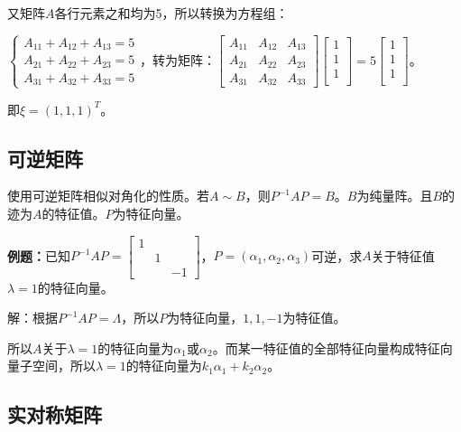 \documentclass[UTF8, 12pt]{ctexart}
\begin{document}
又矩阵$A$各行元素之和均为5，所以转换为方程组：\medskip

$\left\{\begin{array}{l}
    A_{11}+A_{12}+A_{13}=5 \\
    A_{21}+A_{22}+A_{23}=5 \\
    A_{31}+A_{32}+A_{33}=5
\end{array}\right.$，转为矩阵：$\left[\begin{array}{ccc}
    A_{11} & A_{12} & A_{13} \\
    A_{21} & A_{22} & A_{23} \\
    A_{31} & A_{32} & A_{33}
\end{array}\right]\left[\begin{array}{c}
    1 \\
    1 \\
    1 \\
\end{array}\right]=5\left[\begin{array}{c}
    1 \\
    1 \\
    1 \\
\end{array}\right]$。\medskip

即$\xi=(1,1,1)^T$。

\subsection{可逆矩阵}

使用可逆矩阵相似对角化的性质。若$A\sim B$，则$P^{-1}AP=B$。$B$为纯量阵。且$B$的迹为$A$的特征值。$P$为特征向量。\medskip

\textbf{例题：}已知$P^{-1}AP=\left[\begin{array}{ccc}
    1 \\
     & 1 \\
     & & -1
\end{array}\right]$，$P=(\alpha_1,\alpha_2,\alpha_3)$可逆，求$A$关于特征值$\lambda=1$的特征向量。

解：根据$P^{-1}AP=\Lambda$，所以$P$为特征向量，$1,1,-1$为特征值。

所以$A$关于$\lambda=1$的特征向量为$\alpha_1$或$\alpha_2$。而某一特征值的全部特征向量构成特征向量子空间，所以$\lambda=1$的特征向量为$k_1\alpha_1+k_2\alpha_2$。

\subsection{实对称矩阵}
\end{document}
